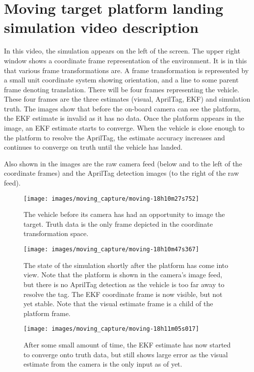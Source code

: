 \chapter{Moving target platform landing simulation video description}\label{app:moving}
In this video, the simulation appears on the left of the screen. The upper right window shows a coordinate
frame representation of the environment. It is in this that various frame transformations are. A
frame transformation is represented by a small unit coordinate system showing orientation, and a line to some
parent frame denoting translation. There will be four frames representing the vehicle. These four frames are
the three estimates (visual, AprilTag, EKF) and simulation truth. The images show that before the on-board
camera can see the platform, the EKF estimate is invalid as it has no data. Once the platform appears in the
image, an EKF estimate starts to converge. When the vehicle is close enough to the platform to resolve the
AprilTag, the estimate accuracy increases and continues to converge on truth until the vehicle has landed.

Also shown in the images are the raw camera feed (below and to the left of the coordinate frames) and the
AprilTag detection images (to the right of the raw feed).

\begin{figure}
    \centering
    \texttt{[image: images/moving\_capture/moving-18h10m27s752]}
    \caption{The vehicle before its camera has had an opportunity to image the target. Truth data is the only
    frame depicted in the coordinate transformation space.}\label{f:tf_truth}
\end{figure}

\begin{figure}
    \centering
    \texttt{[image: images/moving\_capture/moving-18h10m47s367]}
    \caption{The state of the simulation shortly after the platform has come into view. Note that the platform
    is shown in the camera's image feed, but there is no AprilTag detection as the vehicle is too far away to
resolve the tag. The EKF coordinate frame is now visible, but not yet stable. Note that the visual estimate
frame is a child of the platform frame.}\label{f:tf_visual}
\end{figure}

\begin{figure}
    \centering
    \texttt{[image: images/moving\_capture/moving-18h11m05s017]}
    \caption{After some small amount of time, the EKF estimate has now started to converge onto truth data,
        but still shows large error as the visual estimate from the camera is the only input as of
    yet.}\label{f:tf_visual2}
\end{figure}

